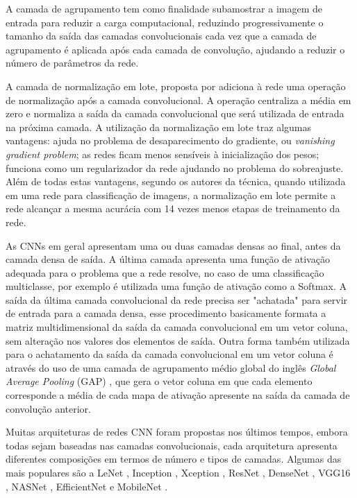 A camada de agrupamento tem como finalidade subamostrar a imagem de entrada para reduzir a carga computacional, reduzindo progressivamente o tamanho da saída das camadas convolucionais cada vez que a camada de agrupamento é aplicada após cada camada de convolução, ajudando a reduzir o número de parâmetros da rede.

A camada de normalização em lote, proposta por \cite{ioffe2015batch} adiciona à rede uma operação de normalização após a camada convolucional. A operação centraliza a média em zero e normaliza a saída da camada convolucional que será utilizada de entrada na próxima camada. A utilização da normalização em lote traz algumas vantagens: ajuda no problema de desaparecimento do gradiente, ou \textit{vanishing gradient problem}; as redes ficam menos sensíveis à inicialização dos pesos; funciona como um regularizador da rede ajudando no problema do sobreajuste. Além de todas estas vantagens, segundo os autores da técnica, quando utilizada em uma rede para classificação de imagens, a normalização em lote permite a rede alcançar a mesma acurácia com 14 vezes menos etapas de treinamento da rede.

As CNNs em geral apresentam uma ou duas camadas densas ao final, antes da camada densa de saída. A última camada apresenta uma função de ativação adequada para o problema que a rede resolve, no caso de uma classificação multiclasse, por exemplo é utilizada uma função de ativação como a Softmax. A saída da última camada convolucional da rede precisa ser "achatada" para servir de entrada para a camada densa, esse procedimento basicamente formata a matriz multidimensional da saída da camada convolucional em um vetor coluna, sem alteração nos valores dos elementos de saída. Outra forma também utilizada para o achatamento da saída da camada convolucional em um vetor coluna é através do uso de uma camada de agrupamento médio global do inglês \textit{Global Average Pooling} (GAP) \cite{lin2013network}, que gera o vetor coluna em que cada elemento corresponde a média de cada mapa de ativação apresente na saída da camada de convolução anterior.

Muitas arquiteturas de redes CNN foram propostas nos últimos tempos, embora todas sejam baseadas nas camadas convolucionais, cada arquitetura apresenta diferentes composições em termos de número e tipos de camadas. Algumas das mais populares são a LeNet \cite{lecun1998gradient},  Inception \cite{szegedy2017inception}, Xception \cite{Chollet2017},  ResNet \cite{he2016deep}, DenseNet \cite{huang2017densely}, VGG16 \cite{simonyan2014very}, NASNet \cite{zoph2018learning}, EfficientNet \cite{tan2019efficientnet} e MobileNet \cite{Sandler2018}.

